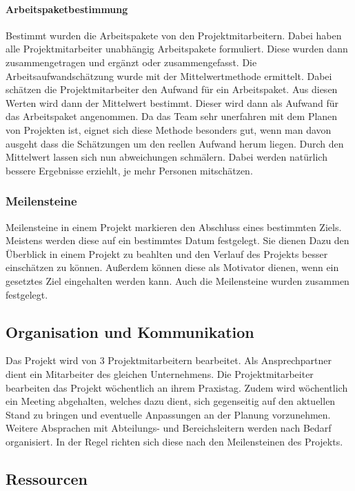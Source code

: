 \documentclass[ThesisDJ.tex]{subfiles}
\begin{document}
\paragraph{Arbeitspaketbestimmung}
Bestimmt wurden die Arbeitspakete von den Projektmitarbeitern. Dabei haben alle Projektmitarbeiter unabhängig Arbeitspakete 
formuliert. Diese wurden dann zusammengetragen und ergänzt oder zusammengefasst.
Die Arbeitsaufwandschätzung wurde mit der Mittelwertmethode ermittelt. Dabei schätzen die Projektmitarbeiter den Aufwand für ein 
Arbeitspaket. Aus diesen Werten wird dann der Mittelwert bestimmt. Dieser wird dann als Aufwand für das Arbeitspaket angenommen. 
Da das Team sehr unerfahren mit dem Planen von Projekten ist, eignet sich diese Methode besonders gut, wenn man davon ausgeht 
dass die Schätzungen um den reellen Aufwand herum liegen. Durch den Mittelwert lassen sich nun abweichungen schmälern. Dabei 
werden natürlich bessere Ergebnisse erziehlt, je mehr Personen mitschätzen. 

\subsubsection{Meilensteine}
Meilensteine in einem Projekt markieren den Abschluss eines bestimmten Ziels. Meistens werden diese auf ein bestimmtes Datum festgelegt.
Sie dienen Dazu den Überblick in einem Projekt zu beahlten und den Verlauf des Projekts besser einschätzen zu können. 
Außerdem können diese als Motivator dienen, wenn ein gesetztes Ziel eingehalten werden kann. 
Auch die Meilensteine wurden zusammen festgelegt.


\subsection{Organisation und Kommunikation}
Das Projekt wird von 3 Projektmitarbeitern bearbeitet. Als Ansprechpartner dient ein Mitarbeiter des gleichen Unternehmens. Die Projektmitarbeiter bearbeiten das Projekt wöchentlich an ihrem Praxistag. Zudem wird wöchentlich ein Meeting abgehalten, welches dazu dient, sich gegenseitig auf den aktuellen Stand zu bringen und eventuelle Anpassungen an der Planung vorzunehmen. Weitere Absprachen mit Abteilungs- und Bereichsleitern werden nach Bedarf organisiert. In der Regel richten sich diese nach den Meilensteinen des Projekts.  

\subsection{Ressourcen}
\end{document}
